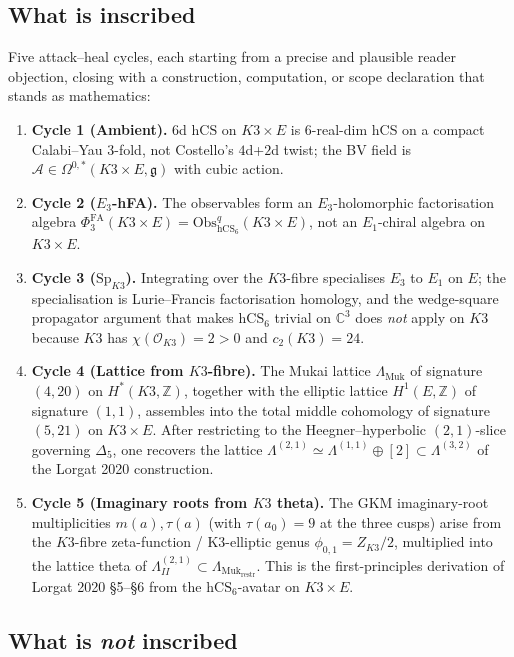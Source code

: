 \documentclass[11pt]{amsart}
\providecommand{\C}{\mathbb{C}}
\providecommand{\Z}{\mathbb{Z}}
\providecommand{\cO}{\mathcal{O}}
\providecommand{\cA}{\mathcal{A}}
\providecommand{\g}{\mathfrak{g}}
\providecommand{\Obs}{\mathrm{Obs}}
\providecommand{\hCS}{\mathrm{hCS}}
\providecommand{\Eone}{E_{1}}
\providecommand{\Ethree}{E_{3}}
\providecommand{\Muk}{\Lambda_{\mathrm{Muk}}}
\providecommand{\HB}{\Lambda^{(2,1)}_{I\!I}}
\providecommand{\HA}{\Lambda^{(2,1)}}
\providecommand{\LamF}{\Lambda^{(3,2)}}
\providecommand{\PhiFA}{\Phi^{\mathrm{FA}}}
\providecommand{\SpF}{\mathrm{Sp}}
\theoremstyle{plain}
\theoremstyle{definition}
\theoremstyle{remark}
\begin{document}
\subsection*{What is inscribed}

Five attack--heal cycles, each starting from a precise and plausible
reader objection, closing with a construction, computation, or scope
declaration that stands as mathematics:

\begin{enumerate}
\item \textbf{Cycle 1 (Ambient).} $6$d $\hCS$ on $K3\times E$ is
$6$-real-dim hCS on a compact Calabi--Yau $3$-fold, not Costello's
$4$d+$2$d twist; the BV field is
$\cA\in \Omega^{0,\ast}(K3\times E, \g)$ with cubic action.
\item \textbf{Cycle 2 ($E_{3}$-hFA).} The observables form an
$E_{3}$-holomorphic factorisation algebra
$\PhiFA_{3}(K3\times E) = \Obs^{q}_{\hCS_{6}}(K3\times E)$, not an
$E_{1}$-chiral algebra on $K3\times E$.
\item \textbf{Cycle 3 ($\SpF_{K3}$).} Integrating over the $K3$-fibre
specialises $\Ethree$ to $\Eone$ on $E$; the specialisation is
Lurie--Francis factorisation homology, and the wedge-square propagator
argument that makes $\hCS_{6}$ trivial on $\C^{3}$ does \emph{not}
apply on $K3$ because $K3$ has $\chi(\cO_{K3}) = 2 > 0$ and
$c_{2}(K3)=24$.
\item \textbf{Cycle 4 (Lattice from $K3$-fibre).} The Mukai lattice
$\Muk$ of signature $(4,20)$ on $H^{\ast}(K3,\Z)$, together with the
elliptic lattice $H^{1}(E,\Z)$ of signature $(1,1)$, assembles into
the total middle cohomology of signature $(5, 21)$ on $K3 \times E$.
After restricting to the Heegner--hyperbolic $(2,1)$-slice governing
$\Delta_{5}$, one recovers the lattice $\HA \simeq \Lambda^{(1,1)}\oplus
[2]\subset \LamF$ of the Lorgat 2020 construction.
\item \textbf{Cycle 5 (Imaginary roots from $K3$ theta).} The GKM
imaginary-root multiplicities $m(a), \tau(a)$ (with $\tau(a_{0})=9$ at
the three cusps) arise from the $K3$-fibre zeta-function / K3-elliptic
genus $\phi_{0,1} = Z_{K3}/2$, multiplied into the lattice theta of
$\HB\subset \Muk_{\mathrm{restr}}$. This is the first-principles
derivation of Lorgat 2020 \S5--\S6 from the $\hCS_{6}$-avatar on
$K3\times E$.
\end{enumerate}

\subsection*{What is \emph{not} inscribed}
\end{document}
